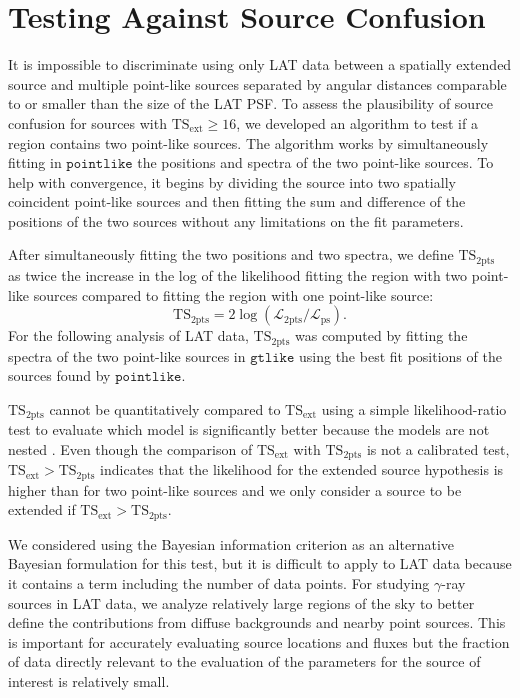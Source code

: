 \documentclass[12pt,preprint]{aastex}
\newcommand{\tsext}{{\ensuremath{\text{TS}_{\text{ext}}}}\xspace}
\newcommand{\tsinc}{\ensuremath{\text{TS}_{\text{2pts}}}\xspace}
\newcommand{\likelihood}{\ensuremath{\mathcal{L}}\xspace}
\newcommand{\gtlike}{\ensuremath{\mathtt{gtlike}}\xspace}
\newcommand{\pointlike}{\ensuremath{\mathtt{pointlike}}\xspace}
\begin{document}
\section{Testing Against Source Confusion}
\label{dual_localization_method}

It is impossible to discriminate using only LAT data between a
spatially extended source and multiple point-like sources separated by
angular distances comparable to or smaller than the size of the LAT PSF. 
To assess the plausibility of source confusion for sources with
$\tsext\ge16$, we developed an algorithm to test if a region contains
two point-like sources.  The algorithm works by simultaneously fitting
in \pointlike the positions and spectra of the two point-like sources.
To help with convergence, it begins by dividing the source into two
spatially coincident point-like sources and then fitting the sum and
difference of the positions of the two sources without any limitations
on the fit parameters.

After simultaneously fitting the two positions and two spectra,
we define \tsinc as twice the increase in the log of the likelihood
fitting the region with two point-like sources compared to fitting the
region with one point-like source:
\begin{equation}
  \tsinc=2\log(\likelihood_\text{2pts}/\likelihood_\text{ps}).
\end{equation} 
For the following analysis of LAT data, \tsinc was computed
by fitting the spectra of the two point-like sources in \gtlike using the best fit positions
of the sources found by \pointlike.

\tsinc cannot be quantitatively compared to \tsext using a simple
likelihood-ratio test to evaluate which model is significantly better
because the models are not nested \citep{statistics_with_care}.
Even though the comparison of \tsext with \tsinc is not a calibrated
test, $\tsext>\tsinc$ indicates that the likelihood for the extended
source hypothesis is higher than for two point-like sources and we only
consider a source to be extended if $\tsext>\tsinc$.

We considered using 
the Bayesian information criterion \citep[BIC,][]{BIC_statistical_test} as
an alternative Bayesian formulation for this test, but it is difficult to apply
to LAT data because it contains a term including the number of data points. 
For studying $\gamma$-ray sources in LAT data, we analyze relatively large
regions of the sky to better define the contributions from diffuse
backgrounds and nearby point sources. This is important for accurately
evaluating source locations and fluxes but the fraction of data directly
relevant to the evaluation of the parameters for the source of interest
is relatively small.
\end{document}
